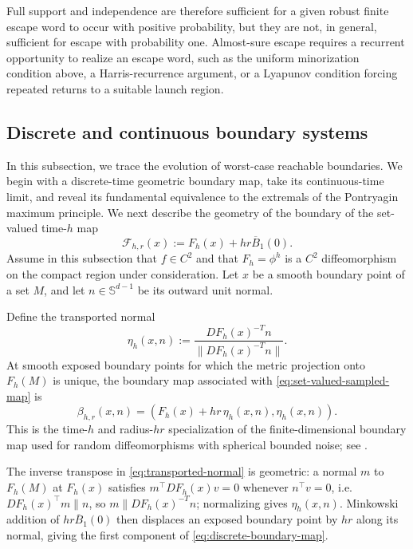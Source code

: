 \documentclass[pdflatex,sn-mathphys-num]{sn-jnl}
\numberwithin{equation}{section}
\theoremstyle{thmstyleone}%
\theoremstyle{definition}
\theoremstyle{remark}
\begin{document}
Full support and independence are therefore sufficient for a given robust
finite escape word to occur with positive probability, but they are not, in
general, sufficient for escape with probability one. Almost-sure escape
requires a recurrent opportunity to realize an escape word, such as the
uniform minorization condition above, a Harris-recurrence argument, or a
Lyapunov condition forcing repeated returns to a suitable launch region.

\subsection{Discrete and continuous boundary systems}
\label{subsec:continuous-boundary-system}

In this subsection, we trace the evolution of worst-case reachable boundaries. We begin with a discrete-time geometric boundary map, take its continuous-time limit, and reveal its fundamental equivalence to the extremals of the Pontryagin maximum principle. We next describe the geometry of the boundary of the set-valued time-$h$ map
\begin{equation}
    \mathcal F_{h,r}(x)
    :=
    F_h(x)+hr\overline B_1(0).
    \label{eq:set-valued-sampled-map}
\end{equation}
Assume in this subsection that $f\in C^2$ and that $F_h=\phi^h$ is a $C^2$ diffeomorphism on the compact region under consideration. Let $x$ be a smooth boundary point of a set $M$, and let $n\in\mathbb S^{d-1}$ be its outward unit normal.

Define the transported normal
\begin{equation}
    \eta_h(x,n)
    :=
    \frac{DF_h(x)^{-T}n}
         {\|DF_h(x)^{-T}n\|}.
    \label{eq:transported-normal}
\end{equation}
At smooth exposed boundary points for which the metric projection onto $F_h(M)$ is unique, the boundary map associated with \eqref{eq:set-valued-sampled-map} is
\begin{equation}
    \beta_{h,r}(x,n)
    =
    \left(
        F_h(x)+hr\,\eta_h(x,n),
        \eta_h(x,n)
    \right).
    \label{eq:discrete-boundary-map}
\end{equation}
This is the time-$h$ and radius-$hr$ specialization of the finite-dimensional boundary map used for random diffeomorphisms with spherical bounded noise; see \citep{lamb2026bifurcations}.

The inverse transpose in \eqref{eq:transported-normal} is geometric: a normal $m$ to $F_h(M)$ at $F_h(x)$ satisfies $m^\top DF_h(x)v=0$ whenever $n^\top v=0$, i.e.\ $DF_h(x)^\top m\parallel n$, so $m\parallel
DF_h(x)^{-T}n$; normalizing gives $\eta_h(x,n)$. Minkowski addition of $hr\overline B_1(0)$ then displaces an exposed boundary point by $hr$ along its normal, giving the first component of \eqref{eq:discrete-boundary-map}.
\end{document}
